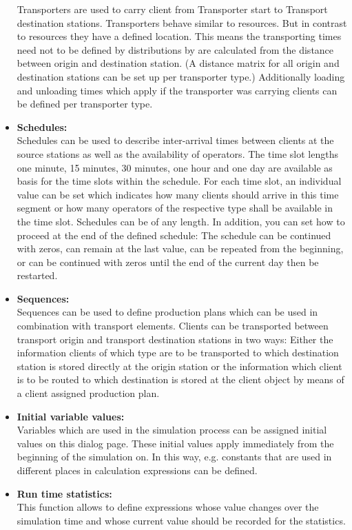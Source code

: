 \documentclass{svmono}
\begin{document}
\begin{itemize}
Transporters are used to carry client from Transporter start to Transport destination stations. Transporters behave similar to resources. But in contrast to resources they have a defined location. This means the transporting times need not to be defined by distributions by are calculated from the distance between origin and destination station. (A distance matrix for all origin and destination stations can be set up per transporter type.) Additionally
loading and unloading times which apply if the transporter was carrying clients can be defined per transporter type.
\item
\textbf{Schedules:}\\
Schedules can be used to describe inter-arrival times between clients  at the source stations as well as the availability of operators. The time slot lengths one minute, 15 minutes, 30 minutes, one hour and one day are available as basis for the time slots within the schedule. For each time slot, an individual value can be set which indicates how many clients should arrive in this time segment or how many operators of the respective type shall be available in the time slot. Schedules can be of any length. In addition, you can set how to proceed at the end of the defined schedule: The schedule can be continued with zeros, can remain at the last value, can be repeated from the beginning, or can be continued with zeros until the end of the current day then be restarted.
\item
\textbf{Sequences:}\\
Sequences can be used to define production plans which can be used in combination with transport elements. Clients can be transported between transport origin and transport destination stations in two ways: Either the information clients of which type are to be transported to which destination station is stored directly at the origin station or the information which client is to be routed to which destination is stored at the client object by means of a client assigned production plan.
\item
\textbf{Initial variable values:}\\
Variables which are used in the simulation process can be assigned initial values on this dialog page. These initial values apply immediately from the beginning of the simulation on. In this way, e.g. constants that are used in different places in calculation expressions can be defined.
\item
\textbf{Run time statistics:}\\
This function allows to define expressions whose value changes over the simulation time and whose current value should be recorded for the statistics.

\end{itemize}
\end{document}
